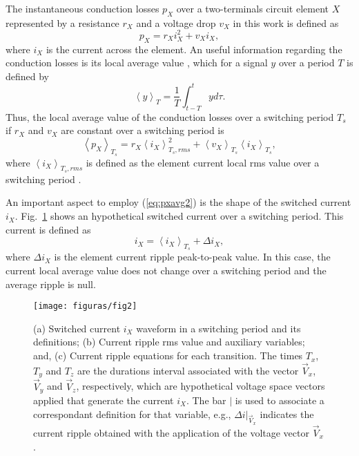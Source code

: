 \documentclass[10pt, onecolumn,conference]{IEEEtran}
\begin{document}
The instantaneous conduction losses $p_X$ over a two-terminals circuit element $X$ represented by a resistance $r_X$ and a voltage drop $v_X$ in this work is defined as
%
\begin{equation}
p_X=r_X i_X^2+v_X  i_X,
\end{equation}  where $i_X$ is the current across the element. An useful information regarding the conduction losses is its local average value \cite{Livros-Erickson}, which for a signal $y$ over a period $T$ is defined by
%
\begin{equation}
\left\langle y \right\rangle_{T}=\dfrac{1}{T}\int_{t-T}^{t}yd\tau.
\end{equation} Thus, the local average value of the conduction losses over a switching period $T_s$ if  $r_X$ and $v_X$ are constant over a switching period is
%
\begin{equation}
\label{eq:pxavg2}
\left\langle p_X \right\rangle_{T_s}=r_X\left\langle i_X \right\rangle_{T_s,{rms}}^2+\left\langle v_X \right\rangle_{T_s}\left\langle i_X \right\rangle_{T_s},
\end{equation} 
%
where $\left\langle i_X \right\rangle_{T_s,{rms}}$ is defined as the element current local rms value over a switching period \cite{Livros-Erickson}. 

An important aspect to employ (\ref{eq:pxavg2}) is the shape of the switched current $i_X$. Fig.~\ref{fig2} shows an hypothetical switched current over a switching period. This current is defined as
%
\begin{equation}
i_X = \left\langle i_X \right\rangle_{T_s} + \Delta i_X,
\end{equation} where $\Delta i_X$ is the element current ripple peak-to-peak value. In this case, the current local average value does not change over a switching period and the average ripple is null. 
% 
\begin{figure}[tp!]
	\centering
	\texttt{[image: figuras/fig2]}
	\caption{(a) Switched current $i_X$ waveform in a switching period and its definitions; (b) Current ripple rms value and auxiliary variables; and, (c) Current ripple equations for each transition. The times $T_x$, $T_y$ and $T_z$ are the durations interval associated with the vector $\vec{V}_x$, $\vec{V}_y$ and $\vec{V}_z$, respectively, which are hypothetical voltage space vectors applied that generate the current $i_X$. The bar $|$ is used to associate a correspondant definition for that variable, e.g., $\Delta i|_{\vec{V}_x}$ indicates the current ripple obtained with the application of the voltage vector $\vec{V}_x$.}
	\label{fig2}
\end{figure}
\end{document}
